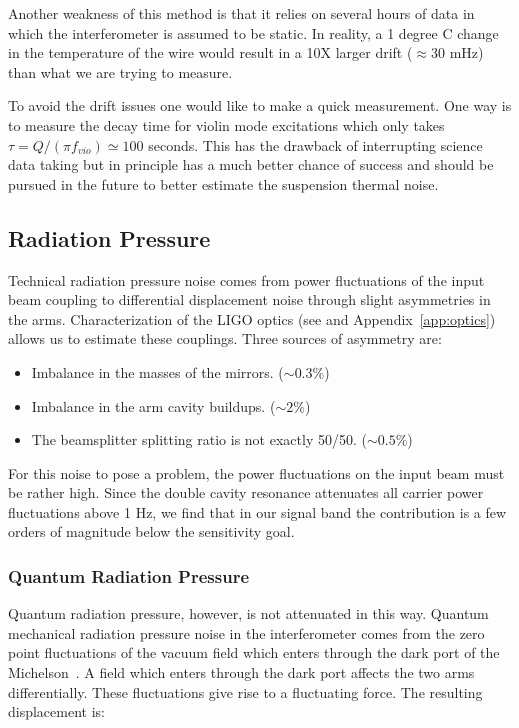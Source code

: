 %


Another weakness of this method is that it relies on several hours of
data in which the interferometer is assumed to be static. In reality,
a 1 degree C change in the temperature of the wire would result in a 10X
larger drift ($\approx$30 mHz) than what we are trying to measure.

To avoid the drift issues one would like to make a quick measurement.
One way is to measure the decay time for violin mode excitations
which only takes $\tau = Q/(\pi f_{vio}) \simeq 100$ seconds. This has the
drawback of interrupting science data taking but in principle has a much better
chance of success and should be pursued in the future to better estimate
the suspension thermal noise.


\subsection{Radiation Pressure}
\label{sec:radpress}

Technical radiation pressure noise comes from power fluctuations
of the input beam coupling to differential displacement noise through slight
asymmetries in the arms. Characterization of the LIGO optics (see \cite{COCwebsite}
and Appendix~\ref{app:optics}) allows us to estimate these couplings. 
Three sources of asymmetry are:

\begin{itemize}
\item Imbalance in the masses of the mirrors. ($\sim 0.3 \%$)
\item Imbalance in the arm cavity buildups. ($\sim 2 \%$)
\item The beamsplitter splitting ratio is not exactly 50/50. ($\sim 0.5 \%$)
\end{itemize}
For this noise to pose a problem, the power fluctuations on the input beam
must be rather high. Since the double cavity resonance attenuates all carrier
power fluctuations above 1 Hz, we find that in our signal band the contribution
is a few orders of magnitude below the sensitivity goal.


\subsubsection{Quantum Radiation Pressure}
Quantum radiation pressure, however, is not attenuated in this way. Quantum
mechanical radiation pressure noise in the interferometer comes from the
zero point fluctuations of the vacuum field which enters through the dark
port of the Michelson~\cite{Caves:RadPress}. A field which enters through the
dark port affects the two arms differentially. These fluctuations give rise to
a fluctuating force. The resulting displacement is:


